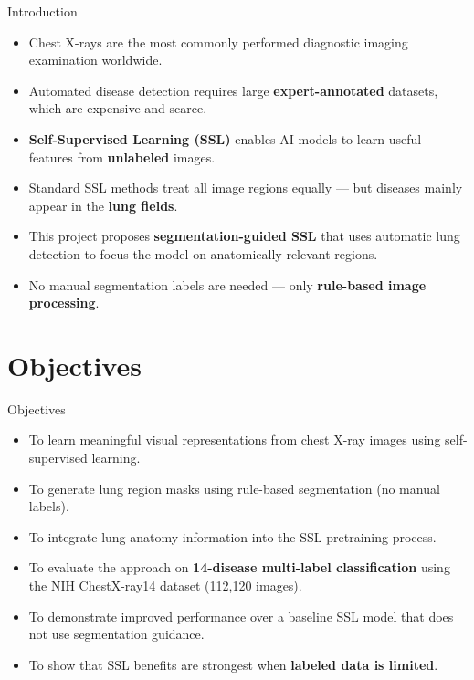 \documentclass{beamer}
\begin{document}
\begin{frame}{Introduction}
\begin{itemize}
    \item Chest X-rays are the most commonly performed diagnostic imaging examination worldwide.
    \vspace{4pt}
    \item Automated disease detection requires large \textbf{expert-annotated} datasets, which are expensive and scarce.
    \vspace{4pt}
    \item \textbf{Self-Supervised Learning (SSL)} enables AI models to learn useful features from \textbf{unlabeled} images.
    \vspace{4pt}
    \item Standard SSL methods treat all image regions equally --- but diseases mainly appear in the \textbf{lung fields}.
    \vspace{4pt}
    \item This project proposes \textbf{segmentation-guided SSL} that uses automatic lung detection to focus the model on anatomically relevant regions.
    \vspace{4pt}
    \item No manual segmentation labels are needed --- only \textbf{rule-based image processing}.
\end{itemize}
\end{frame}


\section{Objectives}

\begin{frame}{Objectives}
\begin{itemize}
    \item To learn meaningful visual representations from chest X-ray images using self-supervised learning.
    \vspace{6pt}
    \item To generate lung region masks using rule-based segmentation (no manual labels).
    \vspace{6pt}
    \item To integrate lung anatomy information into the SSL pretraining process.
    \vspace{6pt}
    \item To evaluate the approach on \textbf{14-disease multi-label classification} using the NIH ChestX-ray14 dataset (112,120 images).
    \vspace{6pt}
    \item To demonstrate improved performance over a baseline SSL model that does not use segmentation guidance.
    \vspace{6pt}
    \item To show that SSL benefits are strongest when \textbf{labeled data is limited}.
\end{itemize}
\end{frame}
\end{document}
